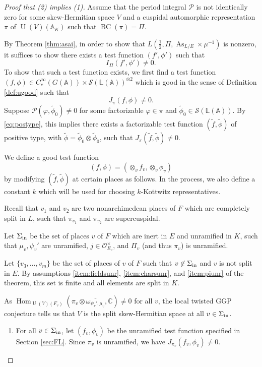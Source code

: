 \documentclass[11pt, reqno]{amsart}
\numberwithin{equation}{subsection}
\theoremstyle{plain}
\theoremstyle{definition}
\newcommand{\wt}{\widetilde}
\renewcommand{\AA}{\mathbb A}
\newcommand{\CC}{\mathbb C}
\newcommand{\LL}{\mathbb L}
\renewcommand{\O}{\mathcal O}
\newcommand{\ol}{\overline}
\renewcommand{\P}{\mathcal P}
\newcommand{\cS}{\mathcal S}
\DeclareMathOperator{\As}{As}
\DeclareMathOperator{\Hom}{Hom}
\DeclareMathOperator{\U}{U}
\newcommand{\inert}{\textnormal{in}}
\begin{document}
\begin{proof}[Proof that (2) implies (1)]
Assume that the period integral $\P$ is not 
identically zero for some skew-Hermitian space $V$
and a cuspidal automorphic representation
$\pi$ of $\U(V)(\AA_K)$ such that $\operatorname{BC}
(\pi) = \Pi$.

By Theorem \ref{thm:asai}, in order to show
that $L(\frac{1}{2}, \Pi, \As_{L/E} \times \mu^{-1})$ is 
nonzero, it suffices to show there exists a test
function $(f', \phi')$ such that
\[ I_\Pi(f', \phi') \neq 0.\]
To show that such a test function exists,
we first find a test function 
$(f, \phi) \in C_c^\infty(G(\AA)) \times 
\cS(\LL(\AA))^{\otimes 2}$ which is good
in the sense of Definition \ref{def:ugood}
such that 
\[ J_\pi(f, \phi) \neq 0.\] 
Suppose $\P(\varphi, \wt\phi_0) \neq 0$ for some factorizable
$\varphi \in \pi$ and $\widetilde \phi_0 \in \cS(\LL(\AA))$.
By \eqref{eq:postype}, this
implies there exists a factorizable test 
function $(\widetilde f, \widetilde\phi)$ of 
positive type, with $\wt\phi = \wt\phi_0 \otimes
\wt\phi_0$,
such that $J_\pi(\widetilde f, \widetilde\phi) \neq 
0$.

We define a good test function 
\[
    (f, \phi) = (\otimes_v f_v, \otimes_v \phi_v)
\]
by modifying $(\wt f, \wt\phi)$ at certain
places as follows. In the process, we also
define a constant $k$ which will be used for choosing 
$k$-Kottwitz representatives.

Recall that $v_1$ and $v_2$ are two nonarchimedean
places of $F$ which are completely split in $L$,
such that $\pi_{v_1}$ and $\pi_{v_2}$ are
supercuspidal.

Let $\Sigma_{\inert}$ be the set of places $v$
of $F$ which are inert in $E$ and unramified
in $K$, such that
$\mu_v, \psi_v'$ are unramified,
$j \in \O_{E_v}^\times$, and $\Pi_v$ (and thus 
$\pi_v$) is unramified.

Let $\{v_3, \dots, v_m\}$ be the set of places of $v$
of $F$ such that $v \not\in \Sigma_\inert$
and $v$ is not split in $E$.
By assumptions \eqref{item:fieldsunr},
\eqref{item:charsunr}, and \eqref{item:piunr} of
the theorem, this set
is finite and all elements are split in $K$.

As $\Hom_{\U(V)(F_v)}(\pi_v \otimes \ol{\omega_{\psi_v',
\mu_v}}, \CC) \neq 0$ 
for all $v$, the local twisted GGP 
conjecture \cite{le2025local} tells us that $V$ is the
split skew-Hermitian space at all $v \in \Sigma_{\inert}$.
\begin{enumerate}[(1)]
\item \label{item:testfnunr}
For all $v \in \Sigma_{\inert}$, let
$(f_v, \phi_v)$ be the unramified
test function specified in Section \ref{sec:FL}. 
Since $\pi_v$ is unramified,
we have $J_{\pi_v}(f_v, \phi_v) \neq 0$.


\end{enumerate}
\end{proof}
\end{document}

